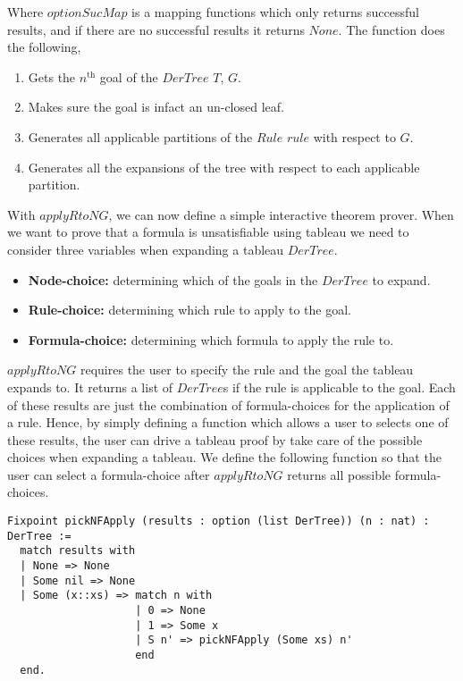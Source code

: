 Where $optionSucMap$ is a mapping functions which only returns successful
results, and if there are no successful results it returns $None$.
The function does the following,

\begin{enumerate}
\item Gets the $n^{\text{th}}$ goal of the $DerTree$ $T$, $G$.
\item Makes sure the goal is infact an un-closed leaf.
\item Generates all applicable partitions of the $Rule$ $rule$ with respect to
      $G$.
\item Generates all the expansions of the tree with respect to each applicable
partition.
\end{enumerate}

With $applyRtoNG$, we can now define a simple interactive theorem prover. When
we want to prove that a formula is unsatisfiable using tableau we need to
consider three variables when expanding a tableau $DerTree$.

\begin{itemize}
\item \textbf{Node-choice:} determining which of the goals in the $DerTree$ to
expand.
\item \textbf{Rule-choice:} determining which rule to apply to the goal.
\item \textbf{Formula-choice:} determining which formula to apply the rule to.
\end{itemize}

$applyRtoNG$ requires the user to specify the rule and the goal the tableau
expands to. It returns a list of $DerTree$s if the rule is applicable to the
goal. Each of these results are just the combination of formula-choices for
the application of a rule. Hence, by simply defining a function which allows a
user to selects one of these results, the user can drive a tableau proof by
take care of the possible choices when expanding a tableau. We define the
following function so that the user can select a formula-choice after
$applyRtoNG$ returns all possible formula-choices.

\begin{lstlisting}
Fixpoint pickNFApply (results : option (list DerTree)) (n : nat) : DerTree :=
  match results with
  | None => None
  | Some nil => None
  | Some (x::xs) => match n with
                    | 0 => None
                    | 1 => Some x
                    | S n' => pickNFApply (Some xs) n'
                    end
  end.
\end{lstlisting}

